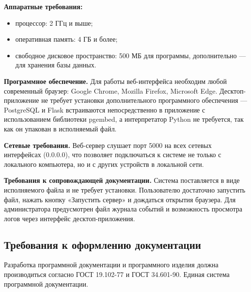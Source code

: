 \textbf{Аппаратные требования:}
\begin{itemize}
	\item процессор: 2 ГГц и выше;
	\item оперативная память: 4 ГБ и более;
	\item свободное дисковое пространство: 500 МБ для программы, дополнительно — для хранения базы данных.
\end{itemize}

\textbf{Программное обеспечение.} Для работы веб-интерфейса необходим любой современный браузер: Google Chrome, Mozilla Firefox, Microsoft Edge. Десктоп-приложение не требует установки дополнительного программного обеспечения — PostgreSQL и Flask встраиваются непосредственно в приложение с использованием библиотеки pgembed, а интерпретатор Python не требуется, так как он упакован в исполняемый файл.

\textbf{Сетевые требования.} Веб-сервер слушает порт 5000 на всех сетевых интерфейсах (0.0.0.0), что позволяет подключаться к системе не только с локального компьютера, но и с других устройств в локальной сети.

\textbf{Требования к сопровождающей документации.} Система поставляется в виде исполняемого файла и не требует установки. Пользователю достаточно запустить файл, нажать кнопку «Запустить сервер» и дождаться открытия браузера. Для администратора предусмотрен файл журнала событий и возможность просмотра логов через интерфейс десктоп-приложения.

\subsection{Требования к оформлению документации}

Разработка программной документации и программного изделия должна производиться согласно ГОСТ 19.102-77 и ГОСТ 34.601-90. Единая система программной документации.